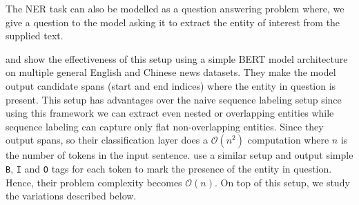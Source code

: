The NER task can also be modelled as a question answering problem where, we give a question to the model asking it to extract the entity of interest from the supplied text. 

\cite{li2019unified} and \cite{li2019dice} show the effectiveness of this setup using a simple BERT model architecture on multiple general English and Chinese news datasets. They make the model output candidate spans (start and end indices) where the entity in question is present. This setup has advantages over the naive sequence labeling setup since using this framework we can extract even nested or overlapping entities while sequence labeling can capture only flat non-overlapping entities. Since they output spans, so their classification layer does a $\mathcal{O}(n^2)$ computation where $n$ is the number of tokens in the input sentence. \cite{banerjee2019knowledge} use a similar setup and output simple \texttt{B}, \texttt{I} and \texttt{O} tags for each token to mark the presence of the entity in question. Hence, their problem complexity becomes $\mathcal{O}(n)$. On top of this setup, we study the variations described below.

